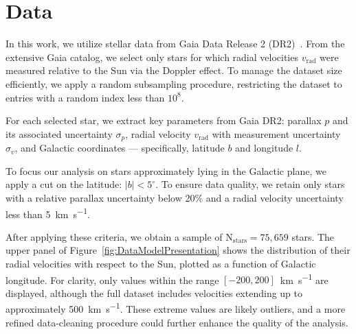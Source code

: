 \section{Data}

In this work, we utilize stellar data from Gaia Data Release 2 (DR2)~\cite{GAIADR2}.  
From the extensive Gaia catalog, we select only stars 
for which radial velocities $v_{\text{rad}}$ were measured relative to the Sun via the Doppler effect.  
To manage the dataset size efficiently, we apply a random subsampling procedure, 
restricting the dataset to entries with a random index less than $10^8$.

For each selected star, we extract key parameters from Gaia DR2: 
parallax $p$ and its associated uncertainty $\sigma_{p}$, 
radial velocity $v_{\text{rad}}$ with measurement uncertainty $\sigma_{v}$, 
and Galactic coordinates — specifically, latitude $b$ and longitude $l$.

To focus our analysis on stars approximately lying in the Galactic plane, we apply a cut on the latitude: $\vert b \vert < 5^\circ$.  
To ensure data quality, we retain only stars with a relative parallax uncertainty below 20\% 
and a radial velocity uncertainty less than 5~\unit{\kilo\meter\per\second}.  

After applying these criteria, we obtain a sample of $\text{N}_{\text{stars}} = 75{,}659$ stars. 
The upper panel of Figure~\ref{fig:DataModelPresentation} shows the distribution of their radial velocities with respect to the Sun, 
plotted as a function of Galactic longitude. For clarity, only values within the range $[-200, 200]$~\unit{\kilo\meter\per\second} are displayed, 
although the full dataset includes velocities extending up to approximately 500~\unit{\kilo\meter\per\second}. 
These extreme values are likely outliers, and a more refined data-cleaning procedure could further enhance the quality of the analysis.

